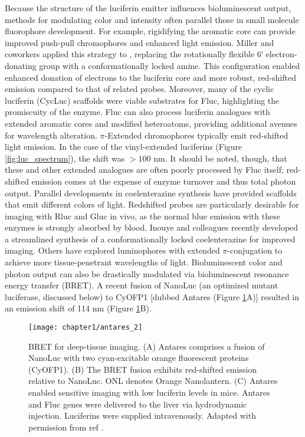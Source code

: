 Because the structure of the luciferin emitter influences
bioluminescent output, methods for modulating color and
intensity often parallel those in small molecule fluorophore
development. For example, rigidifying the aromatic core can
provide improved push-pull chromophores and enhanced
light emission. Miller and coworkers applied this strategy to \dluciferin{},
replacing the rotationally flexible 6ʹ electron-donating
group with a conformationally locked amine.\cite{Reddy:2010gaa} This configuration
enabled enhanced donation of electrons to the luciferin
core and more robust, red-shifted emission compared to that of
related probes.\cite{Chu:2016im} Moreover, many of the cyclic luciferin (CycLuc)
scaffolds were viable substrates for Fluc, highlighting the
promiscuity of the enzyme.
Fluc can also process luciferin analogues with extended
aromatic cores and modified heteroatoms, providing additional
avenues for wavelength alteration.\cite{McCutcheon:2012ixb,Woodroofe:2012vx,RN100} $\pi$-Extended chromophores
typically emit red-shifted light emission.\cite{Kuchimaru:2016eba} In the case of
the vinyl-extended luciferins (Figure \ref{fig:luc_spectrum}), the shift was $>$100 nm.
It should be noted, though, that these and other extended
analogues are often poorly processed by Fluc itself; red-shifted
emission comes at the expense of enzyme turnover and thus
total photon output.
Parallel developments in coelenterazine synthesis have
provided scaffolds that emit different colors of light. Redshifted
probes are particularly desirable for imaging with Rluc
and Gluc in vivo, as the normal blue emission with these
enzymes is strongly absorbed by blood.\cite{Zhao:2005if} Inouye and colleagues
recently developed a streamlined synthesis of a conformationally
locked coelenterazine for improved imaging.\cite{Hosoya:2015iu} Others have
explored luminophores with extended $\pi$-conjugation to achieve
more tissue-penetrant wavelengths of light.\cite{Nishihara:2014cr,Grinstead:2016gh}
Bioluminescent color and photon output can also be
drastically modulated via bioluminescent resonance energy
transfer (BRET). A recent fusion of NanoLuc (an optimized
mutant luciferase, discussed below) to CyOFP1 [dubbed
Antares (Figure \ref{fig:antares}A)] resulted in an emission shift of 114 nm
(Figure \ref{fig:antares}B).\cite{Chu:2016im}

\begin{figure}[htbp]
\texttt{[image: chapter1/antares\_2]}
\centering
\caption[BRET for deep-tissue imaging]{BRET for deep-tissue imaging. (A) Antares comprises a
fusion of NanoLuc with two cyan-excitable orange fluorescent proteins
(CyOFP1). (B) The BRET fusion exhibits red-shifted emission
relative to NanoLuc. ONL denotes Orange Nanolantern. (C) Antares enabled
sensitive imaging with low luciferin levels in mice. Antares and
Fluc genes were delivered to the liver via hydrodynamic injection.
Luciferins were supplied intravenously. Adapted with permission from
ref \cite{Chu:2016im}.}
  \label{fig:antares}
\end{figure}

